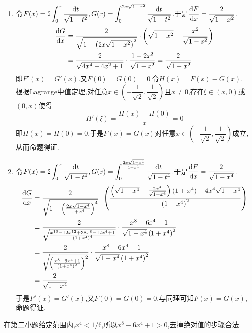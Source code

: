 \documentclass{ctexart}
\begin{document}
\begin{solution}
\begin{enumerate}[label=\tbf{(\arabic*)}]
        \item 令$\displaystyle F(x)=2\int_0^x\dfrac{\mathrm{d} t}{\sqrt{1-t^2}},G(x)=\int_0^{2x\sqrt{1-x^2}}\dfrac{\mathrm{d} t}{\sqrt{1-t^2}}$.于是$\dfrac{\mathrm{d} F}{\mathrm{d} x}=\dfrac{2}{\sqrt{1-x^2}}$.
            \[\begin{aligned}
                \dfrac{\mathrm{d} G}{\mathrm{d} x}
                &= \dfrac{2}{\sqrt{1-\left(2x\sqrt{1-x^2}\right)^2}}\cdot\left(\sqrt{1-x^2}-\dfrac{x^2}{\sqrt{1-x^2}}\right) \\
                &= \dfrac{2}{\sqrt{4x^4-4x^2+1}}\cdot\dfrac{1-2x^2}{\sqrt{1-x^2}}=\dfrac{2}{\sqrt{1-x^2}}
            \end{aligned}\]
            即$F'(x)=G'(x)$.又$F(0)=G(0)=0$.令$H(x)=F(x)-G(x)$.\\
            根据Lagrange中值定理,对任意$x\in\left(-\dfrac{1}{\sqrt2},\dfrac{1}{\sqrt2}\right)$且$x\neq0$,存在$\xi\in(x,0)$或$(0,x)$使得
            \[H'(\xi)=\dfrac{H(x)-H(0)}{x}=0\]
            即$H(x)=H(0)=0$,于是$F(x)=G(x)$对任意$x\in\left(-\dfrac{1}{\sqrt2},\dfrac{1}{\sqrt2}\right)$成立,从而命题得证.
        \item 令$\displaystyle F(x)=2\int_0^x\dfrac{\mathrm{d} t}{\sqrt{1-t^4}},G(x)=\int_{0}^{\frac{2x\sqrt{1-x^4}}{1+x^4}}\dfrac{\mathrm{d} t}{\sqrt{1-t^4}}$.于是$\dfrac{\mathrm{d} F}{\mathrm{d} x}=\dfrac{2}{\sqrt{1-x^4}}$.
            \[\begin{aligned}
                \dfrac{\mathrm{d} G}{\mathrm{d} x}
                &= \dfrac{2}{\sqrt{1-\left(\frac{2x\sqrt{1-x^4}}{1+x^4}\right)^4}}\cdot\left(\dfrac{\left(\sqrt{1-x^4}-\frac{2x^4}{\sqrt{1-x^4}}\right)(1+x^4)-4x^4\sqrt{1-x^4}}{\left(1+x^4\right)^2}\right) \\
                &= \dfrac{2}{\sqrt{\frac{x^{16}-12x^{12}+38x^8-12x^4+1}{\left(1+x^4\right)^4}}}\cdot\dfrac{x^8-6x^4+1}{\sqrt{1-x^4}\left(1+x^4\right)^2} \\
                &= \dfrac{2}{\sqrt{\left(\frac{x^8-6x^4+1}{(1+x^4)^2}\right)^2}}\cdot\dfrac{x^8-6x^4+1}{\sqrt{1-x^4}\left(1+x^4\right)^2} \\
                &= \dfrac{2}{\sqrt{1-x^4}}
            \end{aligned}\]
            于是$F'(x)=G'(x)$,又$F(0)=G(0)=0$.与同理可知$F(x)=G(x)$,命题得证.
    \end{enumerate}
在第二小题给定范围内,$x^4<1/6$,所以$x^8-6x^4+1>0$,去掉绝对值的步骤合法.

\end{solution}
\end{document}
